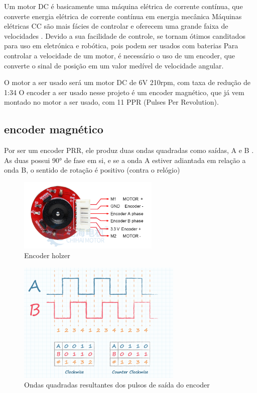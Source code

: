 Um motor DC é basicamente uma máquina elétrica de corrente contínua, que converte energia elétrica de corrente contínua em energia mecânica
Máquinas elétricas CC são mais fácies de controlar e oferecem uma grande faixa de velocidades \cite{Maquinas_eletricas}.
Devido a sua facilidade de controle, se tornam ótimos canditados para uso em eletrónica e robótica, pois podem ser usados com baterias
Para controlar a velocidade de um motor, é necessário o uso de um encoder, que converte o sinal de posição em um valor medível de velocidade angular.


O motor a ser usado será um motor DC de 6V 210rpm, com taxa de redução de 1:34
O encoder a ser usado nesse projeto é um encoder magnético, que já vem montado no motor a ser usado, com 11 PPR (Pulses Per Revolution).

\subsection{encoder magnético}

Por ser um encoder PRR, ele produz duas ondas quadradas como saídas, A e B \cite{encoder_ppr}.
As duas possui 90° de fase em si, e se a onda A estiver adiantada em relação a onda B, o sentido de rotação é positivo (contra o relógio)


\begin{figure}[h]
	\centering
	\includegraphics[width=0.6\textwidth]{figures/encoder_holzer}
	\caption{Encoder holzer \cite{encoder_holzer}}
\end{figure}


\begin{figure}[h]
	\centering
	\includegraphics[width=0.7\textwidth]{figures/encoder_pulso_ab}
	\caption{Ondas quadradas resultantes dos pulsos de saída do encoder \cite{encoder_ppr}}
\end{figure}


